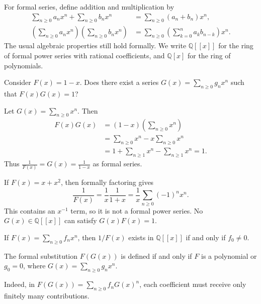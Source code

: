 For formal series, define addition and multiplication by
\begin{align*}
\sum_{n\ge0}a_nx^n+\sum_{n\ge0}b_nx^n
  &=\sum_{n\ge0}(a_n+b_n)x^n,\\
\left(\sum_{n\ge0}a_nx^n\right)\left(\sum_{n\ge0}b_nx^n\right)
  &=\sum_{n\ge0}\left(\sum_{k=0}^n a_kb_{n-k}\right)x^n.
\end{align*}
The usual algebraic properties still hold formally. We write $\mathbb{Q}[[x]]$ for the ring of formal power series with rational coefficients, and $\mathbb{Q}[x]$ for the ring of polynomials.
\begin{example}
Consider $F(x)=1-x$. Does there exist a series $\displaystyle G(x)=\sum_{n\ge0}g_nx^n$ such that $F(x)G(x)=1$?\par\medskip
Let $\displaystyle G(x)=\sum_{n\ge0}x^n$. Then
\begin{align*}
F(x)G(x)&=(1-x)\left(\sum_{n\ge0}x^n\right)\\
&=\sum_{n\ge0}x^n-x\sum_{n\ge0}x^n\\
&=1+\sum_{n\ge1}x^n-\sum_{n\ge1}x^n=1.
\end{align*}
Thus $\displaystyle\frac1{F(x)}=G(x)=\frac1{1-x}$ as formal series.
\end{example}
\begin{example}
If $F(x)=x+x^2$, then formally factoring gives
\[
\frac1{F(x)}=\frac1x\frac1{1+x}
=\frac1x\sum_{n\ge0}(-1)^nx^n.
\]
This contains an $x^{-1}$ term, so it is not a formal power series. No $G(x)\in\mathbb{Q}[[x]]$ can satisfy $G(x)F(x)=1$.
\end{example}
\begin{lemma}
If $\displaystyle F(x)=\sum_{n\ge0}f_nx^n$, then $1/F(x)$ exists in $\mathbb{Q}[[x]]$ if and only if $f_0\ne0$.
\end{lemma}
\begin{lemma}
The formal substitution $F(G(x))$ is defined if and only if $F$ is a polynomial or $g_0=0$, where $\displaystyle G(x)=\sum_{n\ge0}g_nx^n$.
\end{lemma}
Indeed, in $\displaystyle F(G(x))=\sum_{n\ge0}f_nG(x)^n$, each coefficient must receive only finitely many contributions.

